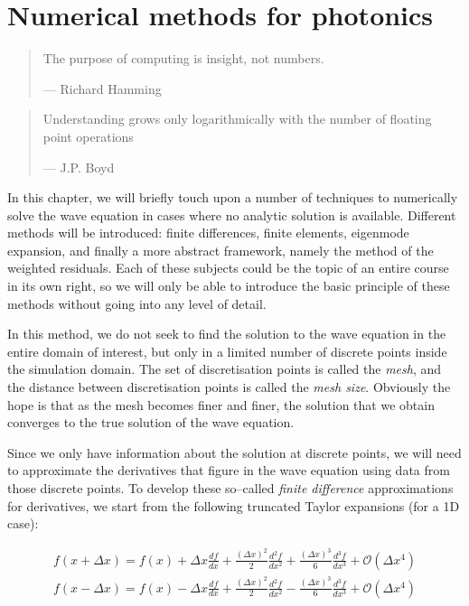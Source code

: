 \chapter{Numerical methods for photonics}
\label{h:numeric}

\begin{quote}
The purpose of computing is insight, not numbers.

--- Richard Hamming
\end{quote}

\begin{quote}
Understanding grows only logarithmically with the number of floating point operations 

--- J.P. Boyd
\end{quote}

\chaptertoc


In this chapter, we will briefly touch upon a number of techniques to numerically solve the wave equation in cases where no analytic solution is available. Different methods will be introduced: finite differences, finite elements, eigenmode expansion, and finally a more abstract framework, namely the method of the weighted residuals. Each of these subjects could be the topic of an entire course in its own right, so we will only be able to introduce the basic principle of these methods without going into any level of detail.


\pagebreak


In this method, we do not seek to find the solution to the wave equation in the entire domain of interest, but only in a limited number of discrete points inside the simulation domain. The set of discretisation points is called the \emph{mesh}, and the distance between discretisation points is called the \emph{mesh size}. Obviously the hope is that as the mesh becomes finer and finer, the solution that we obtain converges to the true solution of the wave equation.

Since we only have information about the solution at discrete points, we will need to approximate the derivatives that figure in the wave equation using data from those discrete points. To develop these so--called \emph{finite difference} approximations for derivatives, we start from the following truncated Taylor expansions (for a 1D case):

\begin{gather}
f(x+\Delta x) = f(x) + \Delta x \frac{d f}{d x} + \frac{{(\Delta x)}^2}{2} \frac{d^2 f}{d x^2} + \frac{{(\Delta x)}^3}{6} \frac{d^3 f}{d x^3} + \mathcal{O}\left(\Delta x^4\right) \label{eq-taylor-plus} \\
f(x-\Delta x) = f(x) - \Delta x \frac{d f}{d x} + \frac{{(\Delta x)}^2}{2} \frac{d^2 f}{d x^2} - \frac{{(\Delta x)}^3}{6} \frac{d^3 f}{d x^3} + \mathcal{O}\left(\Delta x^4\right) \label{eq-taylor-min}
\end{gather} 

